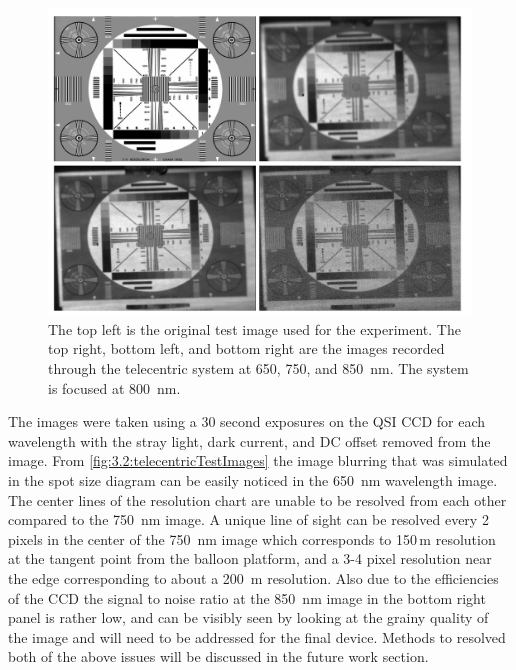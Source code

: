 \begin{figure}[h!]
    \begin{center}
    \includegraphics[width=1.0\textwidth]{./Images/3-2-TelecentricTestImages.pdf}
    \caption[Telecentric Prototype Laboratory Test Images]{The top left is the original test image used for the experiment. The top right, bottom left, and bottom right are the images recorded through the telecentric system at 650, 750, and 850~nm. The system is focused at 800~nm.}
    \label{fig:3.2:telecentricTestImages}
    \end{center}
\end{figure}

The images were taken using a 30 second exposures on the QSI CCD for each wavelength with the stray light, dark current, and DC offset removed from the image. From \autoref{fig:3.2:telecentricTestImages} the image blurring that was simulated in the spot size diagram can be easily noticed in the 650~nm wavelength image. The center lines of the resolution chart are unable to be resolved from each other compared to the 750~nm image. A unique line of sight can be resolved every 2 pixels in the center of the 750~nm image which corresponds to 150\,m resolution at the tangent point from the balloon platform, and a 3-4 pixel resolution near the edge corresponding to about a 200~m resolution. Also due to the efficiencies of the CCD the signal to noise ratio at the 850~nm image in the bottom right panel is rather low, and can be visibly seen by looking at the grainy quality of the image and will need to be addressed for the final device. Methods to resolved both of the above issues will be discussed in the future work section.

